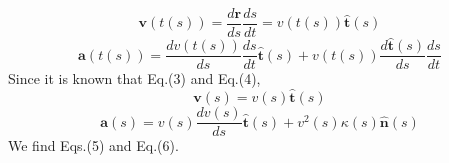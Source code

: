 \documentclass[11pt,letterpaper]{article}
\begin{document}
\begin{equation}
\mathbf v(t(s))
=
\frac{d\mathbf r}{ds}
\frac{ds}{dt}
=
v(t(s))
\hat{\mathbf t}(s)
\tag{3}
\end{equation}
\begin{equation}
\mathbf a(t(s))
=
\frac{dv(t(s))}{ds}
\frac{ds}{dt}
\hat{\mathbf t}(s)
+
v(t(s))
\frac{d\hat{\mathbf t}(s)}{ds}
\frac{ds}{dt}
\tag{4}
\end{equation}
Since it is known that Eq.(3) and Eq.(4),
\begin{equation}
\mathbf v(s)
=
v(s)\hat{\mathbf t}(s)
\tag{5}
\end{equation}
\begin{equation}
\mathbf a(s)
=
v(s)\frac{dv(s)}{ds}\hat{\mathbf t}(s)
+
v^2(s)\kappa(s)\hat{\mathbf n}(s)
\tag{6}
\end{equation}
We find Eqs.(5) and Eq.(6).
\end{document}
